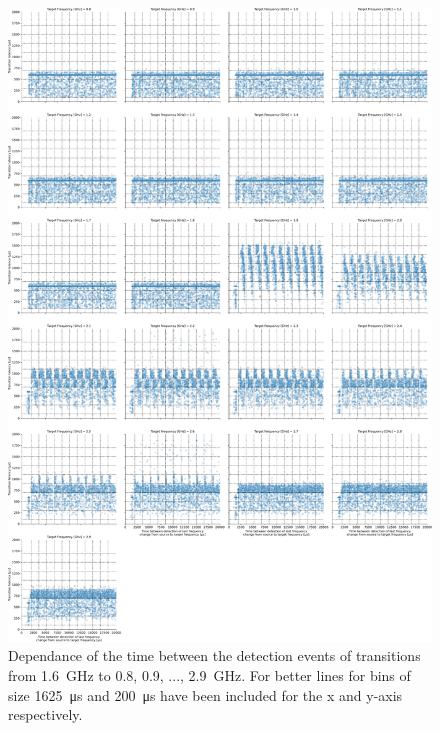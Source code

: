 \begin{figure}[]
    \centering
    \includegraphics[width=\columnwidth]{fig/ftalat_scatter_wait_transition_latency_hati_source_1.6.pdf}
    \caption{Dependance of the time between the detection events of transitions from \SI{1.6}{\GHz} to \SI{0.8}{}, \SI{0.9}{}, ..., \SI{2.9}{\GHz}. For better lines for bins of size \SI{1625}{\us} and \SI{200}{\us} have been included for the x and y-axis respectively.}
\end{figure}
